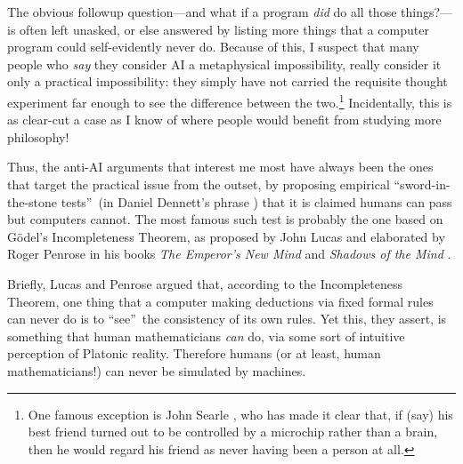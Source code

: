 \documentclass[12pt,onecolumn]{article}%
\begin{document}
The obvious followup question---and what if a program \textit{did} do all
those things?---is often left unasked, or else answered by listing more things
that a computer program could self-evidently never do. Because of this, I
suspect that many people who \textit{say} they consider AI a metaphysical
impossibility, really consider it only a practical impossibility: they simply
have not carried the requisite thought experiment far enough to see the
difference between the two.\footnote{One famous exception is John Searle
\cite{searle}, who has made it clear that, if (say) his best friend turned out
to be controlled by a microchip rather than a brain, then he would regard his
friend as never having been a person at all.} Incidentally, this is as
clear-cut a case as I know of where people would benefit from studying more philosophy!

Thus, the anti-AI arguments that interest me most have always been the ones
that target the practical issue from the outset, by proposing empirical
\textquotedblleft sword-in-the-stone tests\textquotedblright\  (in Daniel
Dennett's phrase \cite{dennett}) that it is claimed humans can pass but
computers cannot. The most famous such test is probably the one based on
G\"{o}del's Incompleteness Theorem, as proposed by John Lucas \cite{lucas} and
elaborated by Roger Penrose in his books \textit{The Emperor's New Mind}
\cite{penrose} and \textit{Shadows of the Mind} \cite{penrose:shadows}.

Briefly, Lucas and Penrose argued that, according to the Incompleteness
Theorem, one thing that a computer making deductions via fixed formal rules
can never do is to \textquotedblleft see\textquotedblright\  the consistency of
its own rules. Yet this, they assert, is something that human mathematicians
\textit{can} do, via some sort of intuitive perception of Platonic reality.
 Therefore humans (or at least, human mathematicians!) can never be simulated
by machines.
\end{document}
